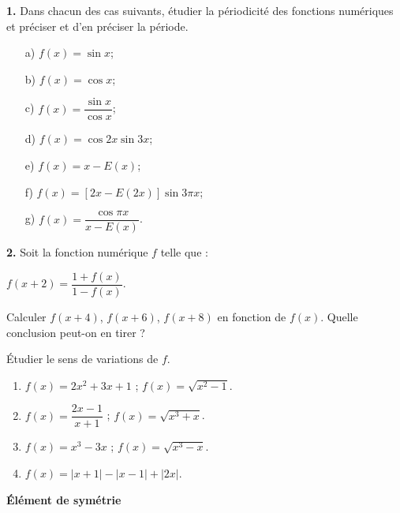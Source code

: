 \documentclass{article}
\begin{document}

\bigskip

\textbf{1.} Dans chacun des cas suivants, étudier la périodicité des fonctions numériques et préciser et d’en préciser la période.

\begin{itemize}
    \item[a)] \( f(x) = \sin x \);
    \item[b)] \( f(x) = \cos x \);
    \item[c)] \( f(x) = \dfrac{\sin x}{\cos x} \);
    \item[d)] \( f(x) = \cos 2x \sin 3x \);
    \item[e)] \( f(x) = x - E(x) \);
    \item[f)] \( f(x) = [2x - E(2x)] \sin 3\pi x \);
    \item[g)] \( f(x) = \dfrac{\cos \pi x}{x - E(x)} \).
\end{itemize}

\bigskip

\textbf{2.} Soit la fonction numérique \( f \) telle que :

\( f(x + 2) = \dfrac{1 + f(x)}{1 - f(x)}. \)

Calculer \( f(x + 4) \), \( f(x + 6) \), \( f(x + 8) \) en fonction de \( f(x) \).  
Quelle conclusion peut-on en tirer ?

 \quad Étudier le sens de variations de \( f \).

\bigskip

\noindent
\begin{enumerate}
    \item \( f(x) = 2x^2 + 3x + 1 \) \quad ; \quad \( f(x) = \sqrt{x^2 - 1} \).
    \item \( f(x) = \dfrac{2x - 1}{x + 1} \) \quad ; \quad \( f(x) = \sqrt{x^3 + x} \).
    \item \( f(x) = x^3 - 3x \) \quad ; \quad \( f(x) = \sqrt{x^3 - x} \).
    \item \( f(x) = |x + 1| - |x - 1| + |2x| \).
\end{enumerate}

\bigskip

 \quad \textbf{Élément de symétrie}

\bigskip
\end{document}
